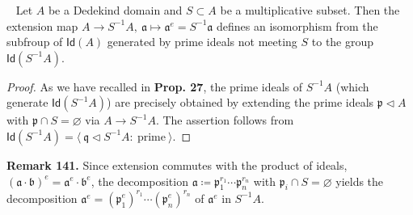 \documentclass[12pt,a4paper,footinclude=true,headinclude=true]{scrbook} %
\newenvironment{corollary}[2][]
{\renewcommand\theinnercustomcol{#2}\innercustomcol[#1]
\begin{mdframed}[backgroundcolor=gray!20]\ }
{\end{mdframed}\endinnercustomcol}
\newenvironment{remark}[2][Remark]
    { \begin{mdframed}[backgroundcolor=gray!20] \textbf{#1 #2.} }
    {  \end{mdframed}}
\begin{document}
\begin{corollary}{140}
    Let $A$ be a Dedekind domain and $S\subset A$ be a multiplicative subset. Then the extension map $A\to S^{-1}A,\ \mathfrak{a} \mapsto\mathfrak{a}^e=S^{-1}\mathfrak{a}$ defines an isomorphism from the subfroup of $\mathsf{Id}(A)$ generated by prime ideals not meeting $S$  to the group $\mathsf{Id}(S^{-1}A)$.
\end{corollary}
\begin{proof}
    As we have recalled in \textbf{Prop. 27}, the prime ideals of $S^{-1}A$ (which generate $\mathsf{Id}(S^{-1}A)$) are precisely obtained by extending the prime ideals $\mathfrak{p}\triangleleft A$ with $\mathfrak{p}\cap S=\varnothing$ via $A\to S^{-1}A$. The assertion follows from $\mathsf{Id}(S^{-1}A)=\langle\  \mathfrak{q} \triangleleft S^{-1}A:\ \text{prime}\ \rangle$. 
\end{proof}

\begin{remark}{141}
    Since extension commutes with the product of ideals, $(\mathfrak{a}\cdot\mathfrak{b})^e=\mathfrak{a}^e\cdot\mathfrak{b}^e$, the decomposition $\mathfrak{a}\coloneqq\mathfrak{p}_1^{r_1}\cdots\mathfrak{p}_n^{r_n}$ with $\mathfrak{p}_i\cap S=\varnothing$ yields the decomposition $\mathfrak{a}^e=(\mathfrak{p}_1^e)^{r_1}\cdots (\mathfrak{p}_n^e)^{r_n}$ of $\mathfrak{a}^e$ in $S^{-1}A$.
\end{remark}
\end{document}
